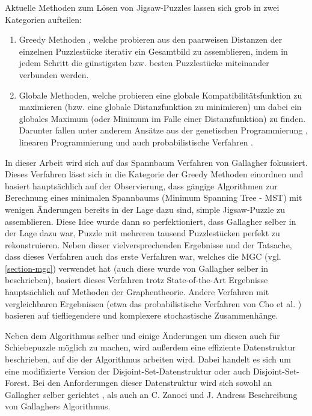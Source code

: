\documentclass{whswinvcbook}
\begin{document}
Aktuelle Methoden zum Lösen von Jigsaw-Puzzles lassen sich grob in zwei Kategorien aufteilen:
\begin{enumerate}
    \item Greedy Methoden \cite{loop,pomeranz,gallagher}, welche probieren aus den paarweisen Distanzen der einzelnen Puzzlestücke iterativ ein Gesamtbild zu assemblieren, indem in jedem Schritt die günstigsten bzw. besten Puzzlestücke miteinander verbunden werden.
    \item Globale Methoden, welche probieren eine globale Kompatibilitätsfunktion zu maximieren (bzw. eine globale Distanzfunktion zu minimieren) um dabei ein globales Maximum (oder Minimum im Falle einer Distanzfunktion) zu finden. Darunter fallen unter anderem Ansätze aus der genetischen Programmierung \cite{genetic}, linearen Programmierung \cite{linear} und auch probabilistische Verfahren \cite{cho}.
\end{enumerate}
In dieser Arbeit wird sich auf das Spannbaum Verfahren von Gallagher \cite{gallagher} fokussiert. Dieses Verfahren lässt sich in die Kategorie der Greedy Methoden einordnen und basiert hauptsächlich auf der Observierung, dass gängige Algorithmen zur Berechnung eines minimalen Spannbaums (Minimum Spanning Tree - MST) mit wenigen Änderungen bereits in der Lage dazu sind, simple Jigsaw-Puzzle zu assemblieren. Diese Idee wurde dann so perfektioniert, dass Gallagher selber in der Lage dazu war, Puzzle mit mehreren tausend Puzzlestücken perfekt zu rekonstruieren. Neben dieser vielversprechenden Ergebnisse und der Tatsache, dass dieses Verfahren auch das erste Verfahren war, welches die MGC (vgl. \ref{section-mgc}) verwendet hat (auch diese wurde von Gallagher selber in \cite{gallagher} beschrieben), basiert dieses Verfahren trotz State-of-the-Art Ergebnisse hauptsächlich auf Methoden der Graphentheorie. Andere Verfahren mit vergleichbaren Ergebnissen (etwa das probabilistische Verfahren von Cho et al. \cite{cho}) basieren auf tiefliegendere und komplexere stochastische Zusammenhänge.

Neben dem Algorithmus selber und einige Änderungen um diesen auch für Schiebepuzzle möglich zu machen, wird außerdem eine effiziente Datenstruktur beschrieben, auf die der Algorithmus arbeiten wird. Dabei handelt es sich um eine modifizierte Version der Disjoint-Set-Datenstruktur oder auch Disjoint-Set-Forest.\cite{dsf} Bei den Anforderungen dieser Datenstruktur wird sich sowohl an Gallagher selber gerichtet \cite{gallagher}, als auch an C. Zanoci und J. Andress Beschreibung von Gallaghers Algorithmus.\cite{crisjim}
\end{document}
